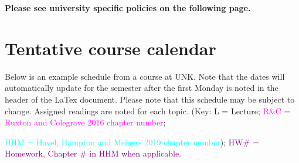 \documentclass[11pt]{article}
\begin{document}
	\skippers
	\textbf{Please see university specific policies on the following page.}
	\newpage
	
	
	
	\section*{Tentative course calendar}
	
	\noindent Below is an example schedule from a course at UNK. Note that the dates will automatically update for the semester after the first Monday is noted in the header of the LaTex document. Please note that this schedule may be subject to change. Assigned readings are noted for each topic. (Key: L = Lecture; \textcolor{magenta}{R\&C = Ruxton and Colegrave 2016 chapter number}; {\textcolor{cyan}{HHM = Havel, Hampton and Meiners 2019 chapter number}); \textcolor{Purple}{HW\# = Homework, Chapter \# in HHM when applicable}.
	
	\SetDate[\startdate]
	
	
}
\end{document}
